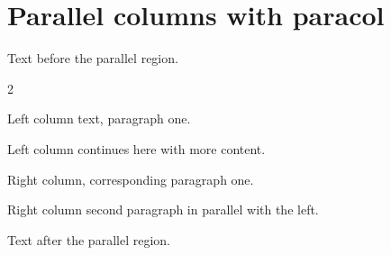 \documentclass{article}
\begin{document}
\section{Parallel columns with paracol}

Text before the parallel region.

\begin{paracol}{2}
\colseprule

Left column text, paragraph one.

Left column continues here with more content.

\switchcolumn

Right column, corresponding paragraph one.

Right column second paragraph in parallel with the left.

\end{paracol}

Text after the parallel region.
\end{document}
